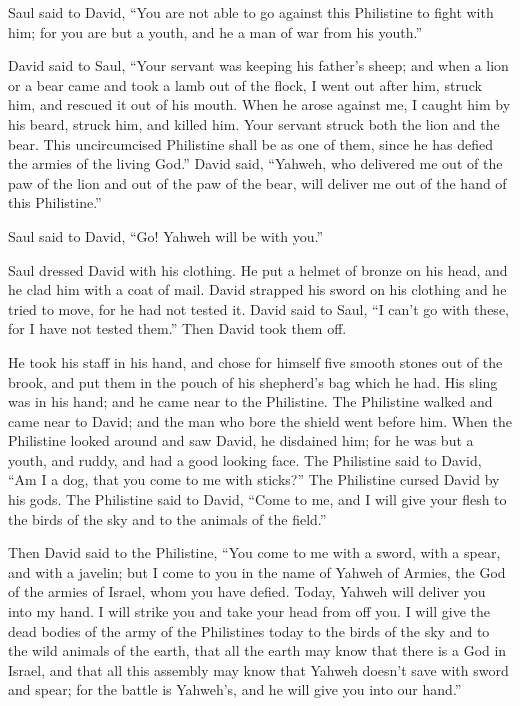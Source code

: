  Saul said to David, ``You are not able to go against this
Philistine to fight with him; for you are but a youth, and he a man of
war from his youth.''

 David said to Saul, ``Your servant was keeping his
father's sheep; and when a lion or a bear came and took a lamb out of
the flock,  I went out after him, struck him, and rescued
it out of his mouth. When he arose against me, I caught him by his
beard, struck him, and killed him.  Your servant struck
both the lion and the bear. This uncircumcised Philistine shall be as
one of them, since he has defied the armies of the living God.''
 David said, ``Yahweh, who delivered me out of the paw of
the lion and out of the paw of the bear, will deliver me out of the hand
of this Philistine.''

Saul said to David, ``Go! Yahweh will be with you.''

 Saul dressed David with his clothing. He put a helmet of
bronze on his head, and he clad him with a coat of mail. 
David strapped his sword on his clothing and he tried to move, for he
had not tested it. David said to Saul, ``I can't go with these, for I
have not tested them.'' Then David took them off.

 He took his staff in his hand, and chose for himself five
smooth stones out of the brook, and put them in the pouch of his
shepherd's bag which he had. His sling was in his hand; and he came near
to the Philistine.  The Philistine walked and came near to
David; and the man who bore the shield went before him. 
When the Philistine looked around and saw David, he disdained him; for
he was but a youth, and ruddy, and had a good looking face.
 The Philistine said to David, ``Am I a dog, that you come
to me with sticks?'' The Philistine cursed David by his gods.
 The Philistine said to David, ``Come to me, and I will
give your flesh to the birds of the sky and to the animals of the
field.''

 Then David said to the Philistine, ``You come to me with a
sword, with a spear, and with a javelin; but I come to you in the name
of Yahweh of Armies, the God of the armies of Israel, whom you have
defied.  Today, Yahweh will deliver you into my hand. I
will strike you and take your head from off you. I will give the dead
bodies of the army of the Philistines today to the birds of the sky and
to the wild animals of the earth, that all the earth may know that there
is a God in Israel,  and that all this assembly may know
that Yahweh doesn't save with sword and spear; for the battle is
Yahweh's, and he will give you into our hand.''

